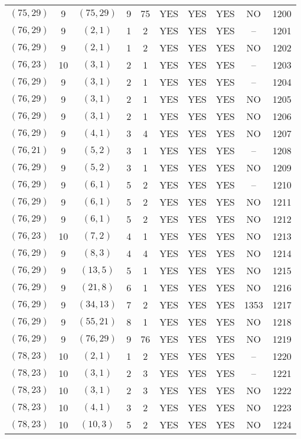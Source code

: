 \begin{longtable}{|c|c|c|c|c|c|c|c|c|c|}
$(75, 29)$ & 9 & $(75, 29)$ & 9 & 75 & YES & YES & YES & NO & 1200\\
$(76, 29)$ & 9 & $(2, 1)$ & 1 & 2 & YES & YES & YES & -- & 1201\\
$(76, 29)$ & 9 & $(2, 1)$ & 1 & 2 & YES & YES & YES & NO & 1202\\
$(76, 23)$ & 10 & $(3, 1)$ & 2 & 1 & YES & YES & YES & -- & 1203\\
$(76, 29)$ & 9 & $(3, 1)$ & 2 & 1 & YES & YES & YES & -- & 1204\\
$(76, 29)$ & 9 & $(3, 1)$ & 2 & 1 & YES & YES & YES & NO & 1205\\
$(76, 29)$ & 9 & $(3, 1)$ & 2 & 1 & YES & YES & YES & NO & 1206\\
$(76, 29)$ & 9 & $(4, 1)$ & 3 & 4 & YES & YES & YES & NO & 1207\\
$(76, 21)$ & 9 & $(5, 2)$ & 3 & 1 & YES & YES & YES & -- & 1208\\
$(76, 29)$ & 9 & $(5, 2)$ & 3 & 1 & YES & YES & YES & NO & 1209\\
$(76, 29)$ & 9 & $(6, 1)$ & 5 & 2 & YES & YES & YES & -- & 1210\\
$(76, 29)$ & 9 & $(6, 1)$ & 5 & 2 & YES & YES & YES & NO & 1211\\
$(76, 29)$ & 9 & $(6, 1)$ & 5 & 2 & YES & YES & YES & NO & 1212\\
$(76, 23)$ & 10 & $(7, 2)$ & 4 & 1 & YES & YES & YES & NO & 1213\\
$(76, 29)$ & 9 & $(8, 3)$ & 4 & 4 & YES & YES & YES & NO & 1214\\
$(76, 29)$ & 9 & $(13, 5)$ & 5 & 1 & YES & YES & YES & NO & 1215\\
$(76, 29)$ & 9 & $(21, 8)$ & 6 & 1 & YES & YES & YES & NO & 1216\\
$(76, 29)$ & 9 & $(34, 13)$ & 7 & 2 & YES & YES & YES & 1353 & 1217\\
$(76, 29)$ & 9 & $(55, 21)$ & 8 & 1 & YES & YES & YES & NO & 1218\\
$(76, 29)$ & 9 & $(76, 29)$ & 9 & 76 & YES & YES & YES & NO & 1219\\
$(78, 23)$ & 10 & $(2, 1)$ & 1 & 2 & YES & YES & YES & -- & 1220\\
$(78, 23)$ & 10 & $(3, 1)$ & 2 & 3 & YES & YES & YES & -- & 1221\\
$(78, 23)$ & 10 & $(3, 1)$ & 2 & 3 & YES & YES & YES & NO & 1222\\
$(78, 23)$ & 10 & $(4, 1)$ & 3 & 2 & YES & YES & YES & NO & 1223\\
$(78, 23)$ & 10 & $(10, 3)$ & 5 & 2 & YES & YES & YES & NO & 1224\\

\end{longtable}
